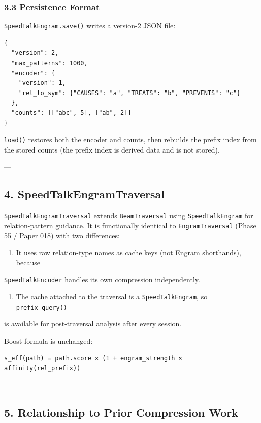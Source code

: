 \subsubsection{3.3 Persistence Format}

\texttt{SpeedTalkEngram.save()} writes a version-2 JSON file:

\begin{lstlisting}
{
  "version": 2,
  "max_patterns": 1000,
  "encoder": {
    "version": 1,
    "rel_to_sym": {"CAUSES": "a", "TREATS": "b", "PREVENTS": "c"}
  },
  "counts": [["abc", 5], ["ab", 2]]
}
\end{lstlisting}

\texttt{load()} restores both the encoder and counts, then rebuilds the prefix index from
the stored counts (the prefix index is derived data and is not stored).

---

\subsection{4. SpeedTalkEngramTraversal}

\texttt{SpeedTalkEngramTraversal} extends \texttt{BeamTraversal} using \texttt{SpeedTalkEngram} for
relation-pattern guidance.  It is funct\-ionally identical to \texttt{EngramTraversal}
(Phase 55 / Paper 018) with two differences:

\begin{enumerate}
\item It uses raw relation-type names as cache keys (not Engram shorthands), because
\end{enumerate}
   \texttt{SpeedTalkEncoder} handles its own compression indep\-endently.
\begin{enumerate}
\item The cache attached to the traversal is a \texttt{SpeedTalkEngram}, so \texttt{prefix\_query()}
\end{enumerate}
   is available for post-traversal analysis after every session.

Boost formula is unchanged:

\begin{lstlisting}
s_eff(path) = path.score × (1 + engram_strength × affinity(rel_prefix))
\end{lstlisting}

---

\subsection{5. Relati\-onship to Prior Compression Work}


